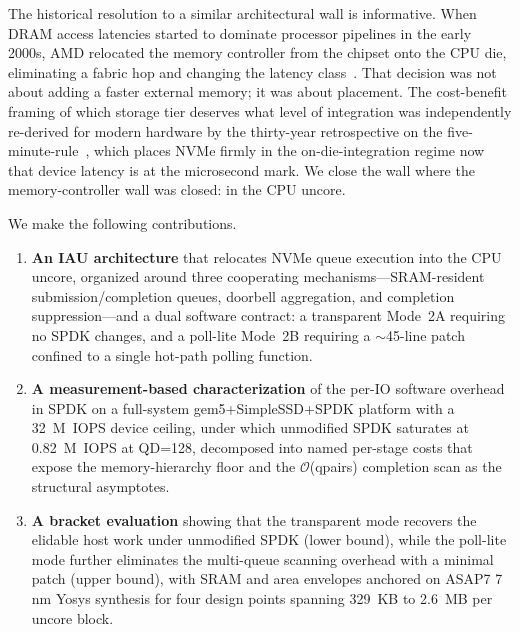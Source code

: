 \documentclass[journal]{IEEEtran}
\begin{document}
The historical resolution to a similar architectural wall is informative.
When DRAM access latencies started to dominate processor pipelines in the
early 2000s, AMD relocated the memory controller from the chipset onto the
CPU die, eliminating a fabric hop and changing the latency
class~\cite{opteron_imc}. That decision was not about adding a faster
external memory; it was about placement. The cost-benefit framing of which
storage tier deserves what level of integration was independently re-derived
for modern hardware by the thirty-year retrospective on the
five-minute-rule~\cite{five_minute_rule_30}, which places NVMe firmly in
the on-die-integration regime now that device latency is at the
microsecond mark. We close the wall where the memory-controller wall was
closed: in the CPU uncore.

We make the following contributions.

\begin{enumerate}
  \item \textbf{An IAU architecture} that relocates NVMe queue
        execution into the CPU uncore, organized around three
        cooperating mechanisms---SRAM-resident submission/completion
        queues, doorbell aggregation, and completion suppression---and a
        dual software contract: a transparent Mode~2A requiring no SPDK
        changes, and a poll-lite Mode~2B requiring a $\sim$45-line patch
        confined to a single hot-path polling function.
  \item \textbf{A measurement-based characterization} of the per-IO
        software overhead in SPDK on a full-system
        gem5+SimpleSSD+SPDK platform with a 32~M~IOPS device ceiling,
        under which unmodified SPDK saturates at 0.82~M~IOPS at QD=128,
        decomposed into named per-stage costs that expose the
        memory-hierarchy floor and the $\mathcal{O}$(qpairs) completion
        scan as the structural asymptotes.
  \item \textbf{A bracket evaluation} showing that the transparent mode
        recovers the elidable host work under unmodified SPDK (lower
        bound), while the poll-lite mode further eliminates the
        multi-queue scanning overhead with a minimal patch (upper
        bound), with SRAM and area envelopes anchored on ASAP7 7\,nm
        Yosys synthesis for four design points spanning 329~KB to
        2.6~MB per uncore block.
\end{enumerate}
\end{document}
